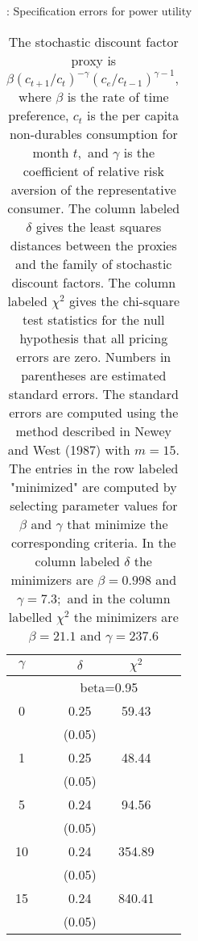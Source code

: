 \documentclass[11pt]{article}
\begin{document}
\begin{table}[H]
\centering
\caption{: Specification errors for power utility} \label{tab:table4}
\caption*{The stochastic discount factor proxy is $\beta\left(c_{t+1} / c_{t}\right)^{-\gamma}\left(c_{e} / c_{t-1}\right)^{\gamma-1},$ where $\beta$ is the rate of time preference, $c_{t}$ is the per capita non-durables consumption for month $t,$ and $\gamma$ is the coefficient of relative risk aversion of the representative consumer.  The column labeled $\delta$ gives the least squares distances between the proxies and the family of stochastic discount factors. The column labeled $\chi^{2}$ gives the chi-square test statistics for the null hypothesis that all pricing errors are zero. Numbers in parentheses are estimated standard errors. The standard errors are computed using the method described in Newey and West (1987) with $m=15$. The entries in the row labeled "minimized" are computed by selecting parameter values for $\beta$ and $\gamma$ that minimize the corresponding criteria. In the column labeled $\delta$ the minimizers are $\beta=0.998$ and $\gamma=7.3 ;$ and in the column labelled $\chi^{2}$ the minimizers are $\beta=21.1$ and $\gamma=237.6$}

\begin{tabular}{ccccc}
\toprule
$\gamma$  &           & $\delta$ & $\chi^{2}$ &  \\
\hline
& \multicolumn{4}{c}{ beta=0.95 } \\
\hline
0      &           & 0.25  & 59.43       &  \\
 &           & (0.05)  &             &  \\
1      &           & 0.25  & 48.44       &  \\
 &           & (0.05)  &             &  \\
5      &           & 0.24  & 94.56       &  \\
 &           & (0.05)  &             &  \\
10     &           & 0.24  & 354.89      &  \\
 &           & (0.05)  &             &  \\
15     &           & 0.24  & 840.41      &  \\
 &           & (0.05)  &             &  \\
 

\end{tabular}
\end{table}
\end{document}
